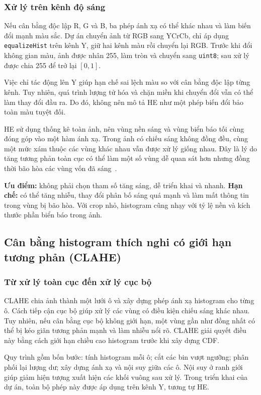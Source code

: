 \subsubsection{Xử lý trên kênh độ sáng}
Nếu cân bằng độc lập R, G và B, ba phép ánh xạ có thể khác nhau và làm biến đổi mạnh màu sắc. Dự án chuyển ảnh từ RGB sang YCrCb, chỉ áp dụng \texttt{equalizeHist} trên kênh Y, giữ hai kênh màu rồi chuyển lại RGB. Trước khi đổi không gian màu, ảnh được nhân 255, làm tròn và chuyển sang \texttt{uint8}; sau xử lý được chia 255 để trở lại $[0,1]$.

Việc chỉ tác động lên Y giúp hạn chế sai lệch màu so với cân bằng độc lập từng kênh. Tuy nhiên, quá trình lượng tử hóa và chặn miền khi chuyển đổi vẫn có thể làm thay đổi đầu ra. Do đó, không nên mô tả HE như một phép biến đổi bảo toàn màu tuyệt đối.

HE sử dụng thống kê toàn ảnh, nên vùng nền sáng và vùng biển báo tối cùng đóng góp vào một hàm ánh xạ. Trong ảnh có chiếu sáng không đồng đều, cùng một mức xám thuộc các vùng khác nhau vẫn được xử lý giống nhau. Đây là lý do tăng tương phản toàn cục có thể làm một số vùng dễ quan sát hơn nhưng đồng thời bão hòa các vùng vốn đã sáng~\cite{opencv}.

\textbf{Ưu điểm:} không phải chọn tham số tăng sáng, dễ triển khai và nhanh. \textbf{Hạn chế:} có thể tăng nhiễu, thay đổi phân bố sáng quá mạnh và làm mất thông tin trong vùng bị bão hòa. Với crop nhỏ, histogram cũng nhạy với tỷ lệ nền và kích thước phần biển báo trong ảnh.

\subsection{Cân bằng histogram thích nghi có giới hạn tương phản (CLAHE)}
\subsubsection{Từ xử lý toàn cục đến xử lý cục bộ}
CLAHE chia ảnh thành một lưới ô và xây dựng phép ánh xạ histogram cho từng ô. Cách tiếp cận cục bộ giúp xử lý các vùng có điều kiện chiếu sáng khác nhau. Tuy nhiên, nếu cân bằng cục bộ không giới hạn, một vùng gần như đồng nhất có thể bị kéo giãn tương phản mạnh và làm nhiễu nổi rõ. CLAHE giải quyết điều này bằng cách giới hạn chiều cao histogram trước khi xây dựng CDF.

Quy trình gồm bốn bước: tính histogram mỗi ô; cắt các bin vượt ngưỡng; phân phối lại lượng dư; xây dựng ánh xạ và nội suy giữa các ô. Nội suy ở ranh giới giúp giảm hiện tượng xuất hiện các khối vuông sau xử lý. Trong triển khai của dự án, toàn bộ phép này được áp dụng trên kênh Y, tương tự HE.

